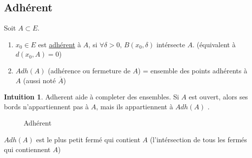 \documentclass[a4paper]{report}
\theoremstyle{definition}
\newtheorem*{intuition}{Intuition}
\begin{document}
\subsection{Adhérent}
\begin{definition}
    Soit $A \subset E$. 
    \begin{enumerate}
        \item $x_0 \in E$ est \underline{adhérent} à $A$, si  $\forall \delta > 0, \, B(x_0, \delta)$ intérsecte $A$. (équivalent à $d(x_0, A) = 0$)
        \item $Adh(A)$ (adhérence ou fermeture de $A$) = ensemble des points adhérents à $A$ (aussi noté $\overline{A}$)
    \end{enumerate}
\end{definition}
\begin{intuition}
   Adherent aide à completer des ensembles. Si $A$ est ouvert, alors ses bords n'appartiennent pas à  $A$, mais ils appartiennent à  $Adh(A)$ .
\end{intuition}
\begin{figure}[H]
   \centering 
    \caption{Adhérent}
\end{figure}
\begin{prop}
   $Adh(A)$ est le plus petit fermé qui contient $A$ (l'intérsection de tous les fermés qui contiennent $A$)
\end{prop}
\end{document}
